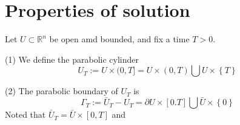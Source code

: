 \section{Properties of solution}

\begin{definition}
    Let $U\subset \mathbb{R}^n$ be open amd bounded, and fix a time $T>0$.

    (1) We define the parabolic cylinder
    \begin{equation*}
        U_T:=U \times(0, T]
        =
        U\times \left(0,T\right)\bigcup U \times \left\{T\right\}
    \end{equation*}

    (2) The parabolic boundary of $U_T$ is
    \begin{equation*}
        \Gamma_T:=\bar{U}_T-U_T
        =
        \partial U \times \left[0.T\right] \bigcup \bar{U} \times \left\{0\right\}
    \end{equation*}
    Noted that $\bar{U}_T= \bar{U} \times \left[0,T\right]$ and
\end{definition}
